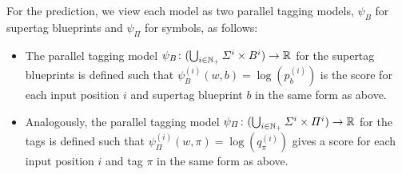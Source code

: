 \documentclass[../../document.tex]{subfiles}
\begin{document}
    For the prediction, we view each model as two parallel tagging models, \(\psi_B\) for supertag blueprints and \(\psi_\varPi\) for  symbols, as follows:
    \begin{itemize}
        \item The parallel tagging model \(\psi_B\colon (\bigcup_{i\in\mathbb{N}_+} \varSigma^i \times B^i) \to \mathbb{R}\) for the supertag blueprints is defined such that \(\psi_B^{(i)}(w, b) = \log(p_b^{(i)})\) is the score for each input position \(i\) and supertag blueprint \(b\) in the same form as above.
        \item Analogously, the parallel tagging model \(\psi_\varPi\colon (\bigcup_{i\in\mathbb{N}_+} \varSigma^i \times \varPi^i) \to \mathbb{R}\) for the  tags is defined such that \(\psi_\varPi^{(i)}(w, \pi) = \log(q_\pi^{(i)})\) gives a score for each input position \(i\) and  tag \(\pi\) in the same form as above.
    \end{itemize}
\end{document}
